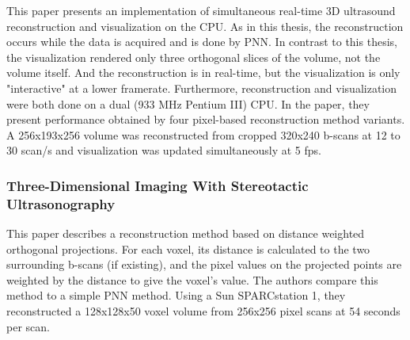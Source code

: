 		This paper presents an implementation of simultaneous real-time 3D ultrasound reconstruction and visualization on the CPU. As in this thesis, the reconstruction occurs while the data is acquired and is done by PNN. In contrast to this thesis, the visualization rendered only three orthogonal slices of the volume, not the volume itself. And the reconstruction is in real-time, but the visualization is only "interactive" at a lower framerate. Furthermore, reconstruction and visualization were both done on a dual (933 MHz Pentium III) CPU. In the paper, they present performance obtained by four pixel-based reconstruction method variants. A 256x193x256 volume was reconstructed from cropped 320x240 b-scans at 12 to 30 scan/s and visualization was updated simultaneously at 5 fps.
		
	
	
		

	
		
	\subsubsection{Three-Dimensional Imaging With Stereotactic Ultrasonography \cite{trobaugh1994}}
		
		This paper describes a reconstruction method based on distance weighted orthogonal projections. For each voxel, its distance is calculated to the two surrounding b-scans (if existing), and the pixel values on the projected points are weighted by the distance to give the voxel's value. The authors compare this method to a simple PNN method. Using a Sun SPARCstation 1, they reconstructed a 128x128x50 voxel volume from 256x256 pixel scans at 54 seconds per scan.
	

